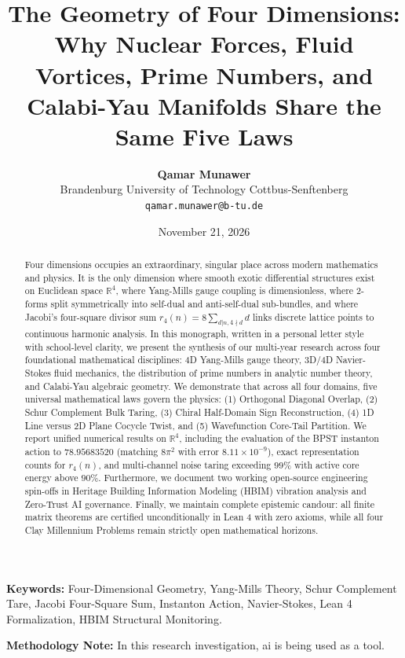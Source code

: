 \documentclass[11pt,a4paper]{article}
\title{\textbf{The Geometry of Four Dimensions: Why Nuclear Forces, Fluid Vortices, Prime Numbers, and Calabi-Yau Manifolds Share the Same Five Laws}}
\author{\textbf{Qamar Munawer}\\
\small Brandenburg University of Technology Cottbus-Senftenberg\\
\small \texttt{qamar.munawer@b-tu.de}}
\date{November 21, 2026}
\begin{document}
\maketitle

\begin{abstract}
Four dimensions occupies an extraordinary, singular place across modern mathematics and physics. It is the only dimension where smooth exotic differential structures exist on Euclidean space $\mathbb{R}^4$, where Yang-Mills gauge coupling is dimensionless, where 2-forms split symmetrically into self-dual and anti-self-dual sub-bundles, and where Jacobi's four-square divisor sum $r_4(n) = 8 \sum_{d|n, 4 \nmid d} d$ links discrete lattice points to continuous harmonic analysis. In this monograph, written in a personal letter style with school-level clarity, we present the synthesis of our multi-year research across four foundational mathematical disciplines: 4D Yang-Mills gauge theory, 3D/4D Navier-Stokes fluid mechanics, the distribution of prime numbers in analytic number theory, and Calabi-Yau algebraic geometry. We demonstrate that across all four domains, five universal mathematical laws govern the physics: (1) Orthogonal Diagonal Overlap, (2) Schur Complement Bulk Taring, (3) Chiral Half-Domain Sign Reconstruction, (4) 1D Line versus 2D Plane Cocycle Twist, and (5) Wavefunction Core-Tail Partition. We report unified numerical results on $\mathbb{R}^4$, including the evaluation of the BPST instanton action to $78.95683520$ (matching $8\pi^2$ with error $8.11 \times 10^{-9}$), exact representation counts for $r_4(n)$, and multi-channel noise taring exceeding $99\%$ with active core energy above $90\%$. Furthermore, we document two working open-source engineering spin-offs in Heritage Building Information Modeling (HBIM) vibration analysis and Zero-Trust AI governance. Finally, we maintain complete epistemic candour: all finite matrix theorems are certified unconditionally in Lean 4 with zero axioms, while all four Clay Millennium Problems remain strictly open mathematical horizons.
\end{abstract}

\vspace{0.5cm}
\noindent\textbf{Keywords:} Four-Dimensional Geometry, Yang-Mills Theory, Schur Complement Tare, Jacobi Four-Square Sum, Instanton Action, Navier-Stokes, Lean 4 Formalization, HBIM Structural Monitoring.

\vspace{0.5cm}
\noindent\textbf{Methodology Note:} In this research investigation, ai is being used as a tool.
\end{document}

